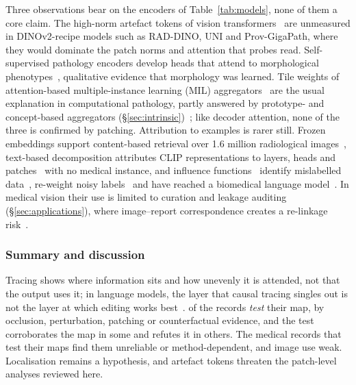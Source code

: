 Three observations bear on the encoders of Table~\ref{tab:models}, none of them a core claim. The
high-norm artefact tokens of vision transformers~\cite{darcet2023vision} are unmeasured in DINOv2-recipe
models such as RAD-DINO, UNI and Prov-GigaPath, where they would dominate the patch norms and attention
that probes read. Self-supervised pathology encoders develop heads that attend to morphological
phenotypes~\cite{chen2022self,chen2024generalpurpose,xu2024wholeslide}, qualitative evidence that
morphology was learned. Tile weights of attention-based multiple-instance learning (MIL)
aggregators~\cite{ilse2018attention,lu2020data} are the usual explanation in computational pathology,
partly answered by prototype- and concept-based aggregators
(\S\ref{sec:intrinsic})~\cite{song2024morphological,huy2025interactive}; like decoder attention, none
of the three is confirmed by patching. Attribution to examples is rarer still. Frozen embeddings support
content-based retrieval over 1.6 million radiological images~\cite{denner2024leveraging}, text-based
decomposition attributes CLIP representations to layers, heads and
patches~\cite{gandelsman2023interpreting,balasubramanian2024decomposing} with no medical instance, and
influence functions~\cite{koh2017influence} identify mislabelled data~\cite{hao2020inaccurate},
re-weight noisy labels~\cite{braun2022influence} and have reached a biomedical language
model~\cite{cao2026scalable}. In medical vision their use is limited to curation and leakage auditing
(\S\ref{sec:applications}), where image--report correspondence creates a re-linkage
risk~\cite{tayebiarasteh2026crossmodal}.

\subsubsection{Summary and discussion}

Tracing shows where information sits and how unevenly it is attended, not that the output uses it; in
language models, the layer that causal tracing singles out is not the layer at which editing works
best~\cite{hase2023does}. \Vtrany{} of the \Vtrn{} records \emph{test} their map, by occlusion,
perturbation, patching or counterfactual evidence, and the test corroborates the map in some and refutes
it in others. The medical records that test their maps find them unreliable or method-dependent, and
image use weak. Localisation remains a hypothesis, and artefact tokens threaten the patch-level
analyses reviewed here.
